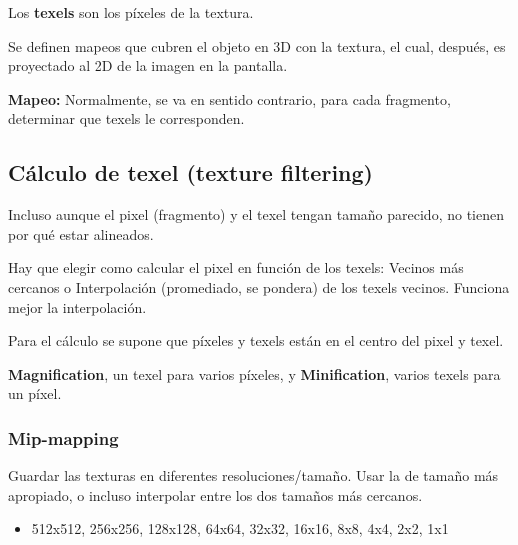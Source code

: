 Los \textbf{texels} son los píxeles de la textura.

Se definen mapeos que cubren el objeto en 3D con la textura, el cual, después, es proyectado al 2D de la imagen en la pantalla.

\textbf{Mapeo:} Normalmente, se va en sentido contrario, para cada fragmento, determinar que texels le corresponden.

\subsection{Cálculo de texel (texture filtering)}
Incluso aunque el pixel (fragmento) y el texel tengan tamaño parecido, no tienen por qué estar alineados.

Hay que elegir como calcular el pixel en función de los texels: Vecinos más cercanos o Interpolación (promediado, se pondera) de los texels vecinos. Funciona mejor la interpolación.

Para el cálculo se supone que píxeles y texels están en el centro  del pixel y texel.

\textbf{Magnification}, un texel para varios píxeles, y \textbf{Minification}, varios texels para un píxel.

\subsubsection{Mip-mapping} 
Guardar las texturas en diferentes resoluciones/tamaño. Usar la de tamaño más apropiado, o incluso interpolar entre los dos tamaños más cercanos. 
\begin{itemize}
    \item 512x512, 256x256, 128x128, 64x64, 32x32, 16x16, 8x8, 4x4, 2x2, 1x1
\end{itemize}


